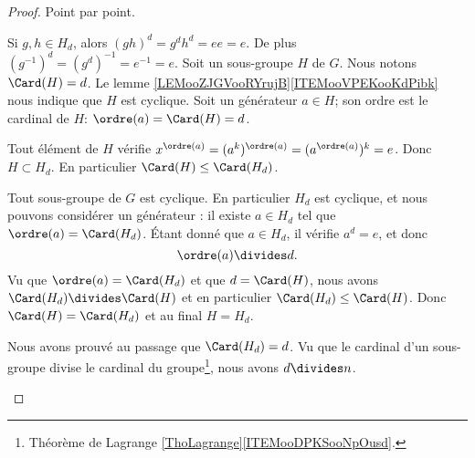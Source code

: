 \begin{proof}
	Point par point.
	\begin{subproof}
		        \label{ITEMooYAMOooVtbCrS}
		Si \( g,h\in H_d\), alors \( (gh)^d=g^dh^d=ee=e\). De plus \( (g^{-1})^d=(g^d)^{-1}=e^{-1}=e\).
		   \label{ITEMooXEXFooIrFOTi}
		Soit un sous-groupe \( H\) de \( G\). Nous notons \( \Card(H)=d\). Le lemme \ref{LEMooZJGVooRYrujB}\ref{ITEMooVPEKooKdPibk} nous indique que \( H\) est cyclique. Soit un générateur \(a\in H\); son ordre est le cardinal de \( H\): \( \ordre(a)=\Card(H)=d\).

		Tout élément de \( H\) vérifie \( x^{\ordre(a)}=(a^k)^{\ordre(a)}=(a^{\ordre(a)})^k=e\). Donc \( H\subset H_d\). En particulier \( \Card(H)\leq \Card(H_d)\).

		Tout sous-groupe de \( G\) est cyclique. En particulier \( H_d\) est cyclique, et nous pouvons considérer un générateur : il existe \( a\in H_d\) tel que \( \ordre(a)=\Card(H_d)\). Étant donné que \( a\in H_d\), il vérifie \( a^d=e\), et donc
		\begin{equation}
			\ordre(a)\divides d.
		\end{equation}
		Vu que \( \ordre(a)=\Card(H_d)\) et que \( d=\Card(H)\), nous avons \( \Card(H_d)\divides \Card(H)\) et en particulier \( \Card(H_d)\leq \Card(H)\). Donc \( \Card(H)=\Card(H_d)\) et au final \( H=H_d\).

		Nous avons prouvé au passage que \( \Card(H_d)=d\). Vu que le cardinal d'un sous-groupe divise le cardinal du groupe\footnote{Théorème de Lagrange \ref{ThoLagrange}\ref{ITEMooDPKSooNpOusd}.}, nous avons \( d\divides n\).


\end{subproof}
\end{proof}
